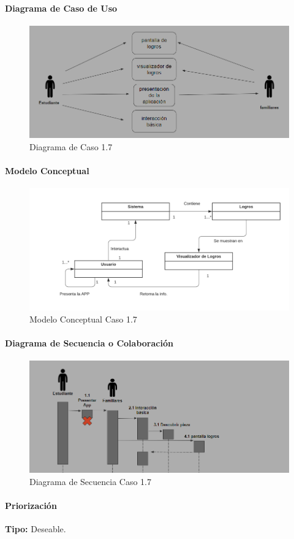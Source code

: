 \paragraph{Diagrama de Caso de Uso}

\begin{figure}[H]
\centerline{\includegraphics[width=15cm]{imgs/CasoUso_7.PNG}}
\caption{Diagrama de Caso 1.7}
\label{fig_7_1}
\end{figure}

\paragraph{Modelo Conceptual}

\begin{figure}[H]
\centerline{\includegraphics[width=15cm]{imgs/ModeloConceptualCaso_7_3.png}}
\caption{Modelo Conceptual Caso 1.7}
\label{fig_7_2}
\end{figure}

\paragraph{Diagrama de Secuencia o Colaboración}

\begin{figure}[H]
\centerline{\includegraphics[width=15cm]{imgs/CasoUso_7_2.PNG}}
\caption{Diagrama de Secuencia Caso 1.7}
\label{fig_7_3}
\end{figure}

\paragraph{Priorización}
{\textbf {Tipo:}}
Deseable.